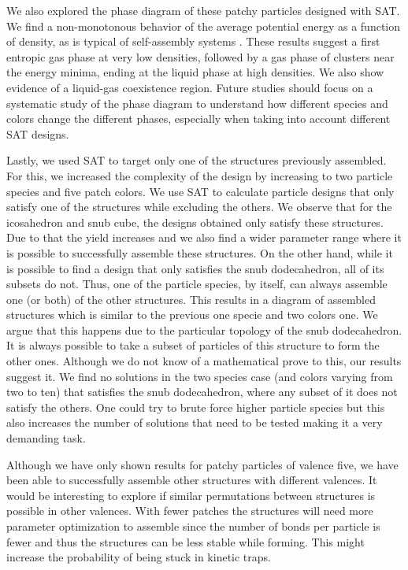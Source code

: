 \documentclass[a4paper, amsfonts, amssymb, amsmath, reprint, showkeys, nofootinbib, twoside]{revtex4-1}
\begin{document}
We also explored the phase diagram of these patchy particles designed with SAT. We find a non-monotonous behavior of the average potential energy as a function of density, as is typical of self-assembly systems \cite{Sciortino2009}. These results suggest a first entropic gas phase at very low densities, followed by a gas phase of clusters near the energy minima, ending at the liquid phase at high densities. We also show evidence of a liquid-gas coexistence region. Future studies should focus on a systematic study of the phase diagram to understand how different species and colors change the different phases, especially when taking into account different SAT designs.

Lastly, we used SAT to target only one of the structures previously assembled. For this, we increased the complexity of the design by increasing to two particle species and five patch colors. We use SAT to calculate particle designs that only satisfy one of the structures while excluding the others. We observe that for the icosahedron and snub cube, the designs obtained only satisfy these structures. Due to that the yield increases and we also find a wider parameter range where it is possible to successfully assemble these structures. On the other hand, while it is possible to find a design that only satisfies the snub dodecahedron, all of its subsets do not. Thus, one of the particle species, by itself, can always assemble one (or both) of the other structures. This results in a diagram of assembled structures which is similar to the previous one specie and two colors one. We argue that this happens due to the particular topology of the snub dodecahedron. It is always possible to take a subset of particles of this structure to form the other ones. Although we do not know of a mathematical prove to this, our results suggest it. We find no solutions in the two species case (and colors varying from two to ten) that satisfies the snub dodecahedron, where any subset of it does not satisfy the others. One could try to brute force higher particle species but this also increases the number of solutions that need to be tested making it a very demanding task.

Although we have only shown results for patchy particles of valence five, we have been able to successfully assemble other structures with different valences. It would be interesting to explore if similar permutations between structures is possible in other valences. With fewer patches the structures will need more parameter optimization to assemble since the number of bonds per particle is fewer and thus the structures can be less stable while forming. This might increase the probability of being stuck in kinetic traps.
\end{document}

